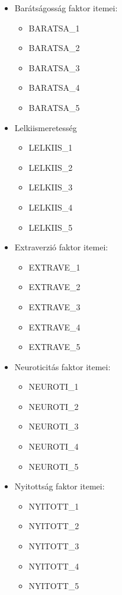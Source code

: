 \documentclass[
  letterpaper,
]{krantz}
\providecommand{\tightlist}{%
  \setlength{\itemsep}{0pt}\setlength{\parskip}{0pt}}\usepackage{longtable,booktabs,array}
\begin{document}
\begin{itemize}
\item
  Barátságosság faktor itemei:

  \begin{itemize}
  \tightlist
  \item
    BARATSA\_1
  \item
    BARATSA\_2
  \item
    BARATSA\_3
  \item
    BARATSA\_4
  \item
    BARATSA\_5
  \end{itemize}
\item
  Lelkiismeretesség

  \begin{itemize}
  \tightlist
  \item
    LELKIIS\_1
  \item
    LELKIIS\_2
  \item
    LELKIIS\_3
  \item
    LELKIIS\_4
  \item
    LELKIIS\_5
  \end{itemize}
\item
  Extraverzió faktor itemei:

  \begin{itemize}
  \tightlist
  \item
    EXTRAVE\_1
  \item
    EXTRAVE\_2
  \item
    EXTRAVE\_3
  \item
    EXTRAVE\_4
  \item
    EXTRAVE\_5
  \end{itemize}
\item
  Neuroticitás faktor itemei:

  \begin{itemize}
  \tightlist
  \item
    NEUROTI\_1
  \item
    NEUROTI\_2
  \item
    NEUROTI\_3
  \item
    NEUROTI\_4
  \item
    NEUROTI\_5
  \end{itemize}
\item
  Nyitottság faktor itemei:

  \begin{itemize}
  \tightlist
  \item
    NYITOTT\_1
  \item
    NYITOTT\_2
  \item
    NYITOTT\_3
  \item
    NYITOTT\_4
  \item
    NYITOTT\_5
  \end{itemize}
\end{itemize}
\end{document}
